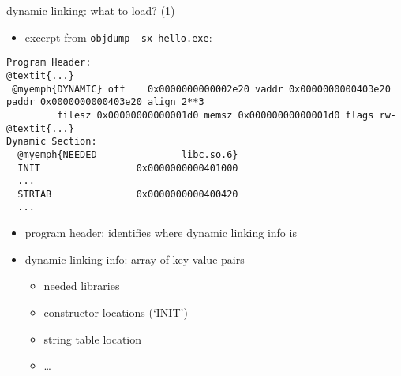 \begin{frame}[fragile,label=dynLinkNeeded1]{dynamic linking: what to load? (1)}
\begin{itemize}
\item excerpt from {\tt objdump -sx hello.exe}:
\end{itemize}
\begin{Verbatim}[commandchars=@\{\},fontsize=\fontsize{9}{10}\selectfont]
Program Header:
@textit{...}
 @myemph{DYNAMIC} off    0x0000000000002e20 vaddr 0x0000000000403e20 paddr 0x0000000000403e20 align 2**3
         filesz 0x00000000000001d0 memsz 0x00000000000001d0 flags rw-
@textit{...}
Dynamic Section:
  @myemph{NEEDED               libc.so.6}
  INIT                 0x0000000000401000
  ...
  STRTAB               0x0000000000400420
  ...
\end{Verbatim}
\begin{itemize}
\item program header: identifies where dynamic linking info is
\item dynamic linking info: array of key-value pairs
    \begin{itemize}
    \item needed libraries
    \item constructor locations (`INIT')
    \item string table location
    \item \ldots
    \end{itemize}
\end{itemize}
\end{frame}

